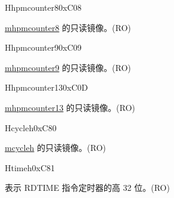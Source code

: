 \begin{register}{H}{hpmcounter8}{0xC08}\label{regdesc:HPMCOUNTER8}
%
\regnewline%
\begin{regdesc}\begin{reglist}
\label{fielddesc:HPMCOUNTER8}\item [HPMCOUNTER8] \hyperref[regdesc:MHPMCOUNTER8]{mhpmcounter8} 的只读镜像。(RO)
\end{reglist}\end{regdesc}
\end{register}


\begin{register}{H}{hpmcounter9}{0xC09}\label{regdesc:HPMCOUNTER9}
%
\regnewline%
\begin{regdesc}\begin{reglist}
\label{fielddesc:HPMCOUNTER9}\item [HPMCOUNTER9] \hyperref[regdesc:MHPMCOUNTER9]{mhpmcounter9} 的只读镜像。(RO)
\end{reglist}\end{regdesc}
\end{register}

\begin{register}{H}{hpmcounter13}{0xC0D}\label{regdesc:HPMCOUNTER13}
%
\regnewline%
\begin{regdesc}\begin{reglist}
\label{fielddesc:HPMCOUNTER13}\item [HPMCOUNTER13] \hyperref[regdesc:MHPMCOUNTER13]{mhpmcounter13} 的只读镜像。(RO)
\end{reglist}\end{regdesc}
\end{register}


\begin{register}{H}{cycleh}{0xC80}\label{regdesc:CYCLEH}
%
\regnewline%
\begin{regdesc}\begin{reglist}
\label{fielddesc:CYCLEH}\item [CYCLEH] \hyperref[regdesc:MCYCLEH]{mcycleh} 的只读镜像。(RO)
\end{reglist}\end{regdesc}
\end{register}

\begin{register}{H}{timeh}{0xC81}\label{regdesc:TIMEH}
%
\regnewline%
\begin{regdesc}\begin{reglist}
\label{fielddesc:TIMEH}\item [TIMEH] 表示 RDTIME 指令定时器的高 32 位。(RO)
\end{reglist}\end{regdesc}
\end{register}

